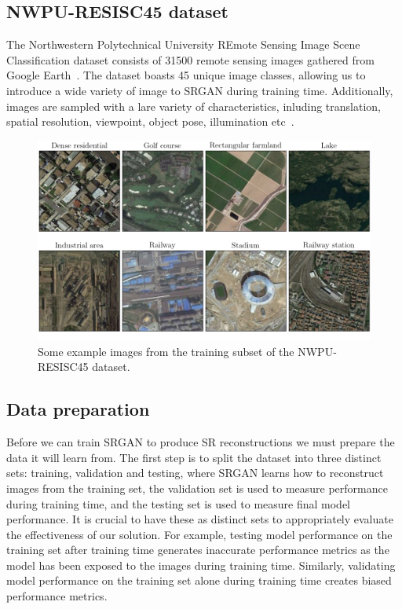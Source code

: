 \subsection{NWPU-RESISC45 dataset}\label{subsec:resisc45}
The Northwestern Polytechnical University REmote Sensing Image Scene Classification dataset consists of 31500 remote sensing images gathered from Google Earth~\cite{resisc45}. The dataset boasts 45 unique image classes, allowing us to introduce a wide variety of image to SRGAN during training time. Additionally, images are sampled with a lare variety of characteristics, inluding translation, spatial resolution, viewpoint, object pose, illumination etc~\cite{resisc45}.
\begin{figure}
    \includegraphics[width=\linewidth]{./assets/resisc45_example.png}
    \caption{Some example images from the training subset of the NWPU-RESISC45 dataset.}
    \label{fig:resisc45_examples}
\end{figure}

\subsection{Data preparation}\label{subsec:data_preparation}
Before we can train SRGAN to produce SR reconstructions we must prepare the data it will learn from. The first step is to split the dataset into three distinct sets: training, validation and testing, where SRGAN learns how to reconstruct images from the training set, the validation set is used to measure performance during training time, and the testing set is used to measure final model performance. It is crucial to have these as distinct sets to appropriately evaluate the effectiveness of our solution. For example, testing model performance on the training set after training time generates inaccurate performance metrics as the model has been exposed to the images during training time. Similarly, validating model performance on the training set alone during training time creates biased performance metrics.

